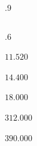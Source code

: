 \documentclass[aspectratio=169, t, 8pt]{beamer}
\begin{document}
\begin{frame}
\begin{enumerate}
\begin{columns}
\begin{column}{.9\textwidth}
\begin{columns}[T, totalwidth=.9\textwidth]
\begin{column}{.6\textwidth}
                            \vspace{1em}
                            \centering
                            \begin{minipage}{0.9\textwidth}
                                \begin{enumerate*}[itemjoin={\hfill}]
                                    \item $11.520$
                                    \item $14.400$
                                    \item $18.000$
                                    \item $312.000$
                                    \item $390.000$
                                \end{enumerate*}
                            \end{minipage}
                            \end{column}

                    \end{columns}

                \end{column}
            \end{columns}
        \end{enumerate}
    \end{frame}
\end{document}
